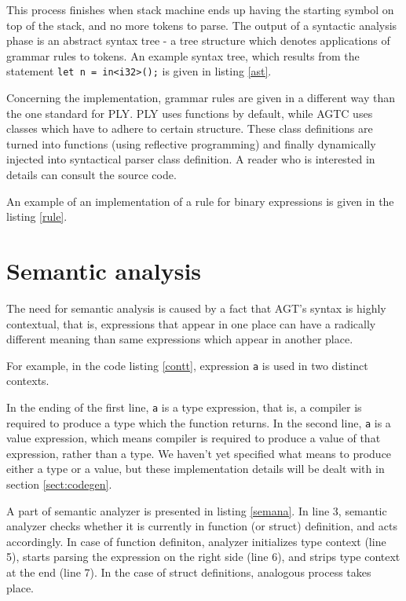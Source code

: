 \documentclass[times, utf8, diplomski]{fer}
\theoremstyle{definition}
\newcommand{\textcode}[3]{
    
}
\begin{document}
This process finishes when stack machine ends up having the starting symbol on top of the stack,
and no more tokens to parse. 
The output of a syntactic analysis phase is an abstract syntax tree - a tree structure
which denotes applications of grammar rules to tokens. An example syntax tree, which
results from the statement \texttt{let n = in<i32>();} is given in listing \ref{ast}.

\textcode{\resdir/compiler/ast}{ast}{AST resulting from \texttt{let n = in<i32>();}}

Concerning the implementation, grammar rules are given in a different way than the
one standard for PLY. PLY uses functions by default, while AGTC uses
classes which have to adhere to certain structure. These class definitions
are turned into functions (using reflective programming) and finally
dynamically injected into syntactical parser class definition.
A reader who is interested in details can consult the source code.

An example of an implementation of a rule for binary expressions is given in the listing \ref{rule}.
\\

\textcode{\resdir/compiler/rule.py}{rule}{Binary expression rule implementation}

\section{Semantic analysis}

The need for semantic analysis is caused by a fact that AGT's syntax is highly contextual,
that is, expressions that appear in one place can have a radically different meaning
than same expressions which appear in another place.

For example, in the code listing \ref{contt}, expression \texttt{a} is used in two distinct contexts.

\textcode{\resdir/compiler/contextual.agt}{contt}{Contextuality of expression \texttt{a}}

In the ending of the first line, \texttt{a} is a type expression, that is, a
compiler is required to produce a type which the function returns. In the
second line, \texttt{a} is a value expression,
which means compiler is required to produce a value of that expression, rather than a type.
We haven't yet specified what means to produce either a type or a value, but these implementation
details will be dealt with in section \ref{sect:codegen}.

A part of semantic analyzer is presented in listing \ref{semana}.
In line 3, semantic analyzer checks whether it is currently in function (or struct) definition, 
and acts accordingly. In case of function definiton, analyzer initializes type context (line 5),
starts parsing the expression on the right side (line 6), 
and strips type context at the end (line 7).
In the case of struct definitions, analogous process takes place.
\end{document}
